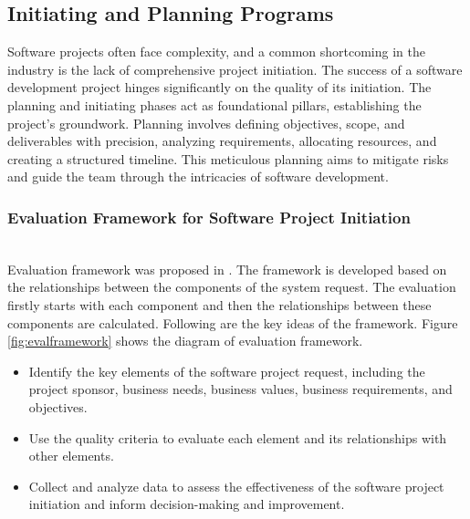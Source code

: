 \documentclass[runningheads]{llncs}
\begin{document}
\subsection{Initiating and Planning Programs}

Software projects often face complexity, and a common shortcoming in the industry is the lack of comprehensive project initiation. The success of a software development project hinges significantly on the quality of its initiation. The planning and initiating phases act as foundational pillars, establishing the project's groundwork. Planning involves defining objectives, scope, and deliverables with precision, analyzing requirements, allocating resources, and creating a structured timeline. This meticulous planning aims to mitigate risks and guide the team through the intricacies of software development.


\subsubsection{Evaluation Framework for Software Project Initiation}\mbox{}\\
Evaluation framework was proposed in \cite{evaluate}. The framework is developed based on the relationships between the components of the system request. The evaluation firstly starts with each component and then the relationships
between these components are calculated. Following are the key ideas of the framework. Figure \ref{fig:evalframework} shows the diagram of evaluation framework.

\begin{itemize}[label=$\bullet$]
    \item Identify the key elements of the software project request, including the project sponsor, business needs, business values, business requirements, and objectives.
    \item Use the quality criteria to evaluate each element and its relationships with other elements.
    \item Collect and analyze data to assess the effectiveness of the software project initiation and inform decision-making and improvement.
\end{itemize}
\end{document}
